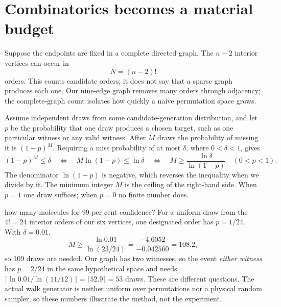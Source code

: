 \section{Combinatorics becomes a material budget}\label{sec:scaling}
Suppose the endpoints are fixed in a complete directed graph. The $n-2$ interior
vertices can occur in
\[
 N=(n-2)!
\]
orders. This counts candidate orders; it does not say that a sparse graph
produces each one. Our nine-edge graph removes many orders through adjacency;
the complete-graph count isolates how quickly a naive permutation space grows.
\begin{center}\end{center}

Assume independent draws from some candidate-generation distribution, and let $p$
be the probability that one draw produces a chosen target, such as one
particular witness or any valid witness. After $M$ draws the probability of
missing it is $(1-p)^M$. Requiring a miss probability of at most $\delta$, where
$0<\delta<1$, gives
\[
 (1-p)^M\le\delta
 \quad\Longleftrightarrow\quad
 M\ln(1-p)\le\ln\delta
 \quad\Longleftrightarrow\quad
 M\ge\frac{\ln\delta}{\ln(1-p)}\quad(0<p<1).
\]
The denominator $\ln(1-p)$ is negative, which reverses the inequality when we
divide by it. The minimum integer $M$ is the ceiling of the right-hand side. When
$p=1$ one draw suffices; when $p=0$ no finite number does.


\begin{Worked}{how many molecules for 99 per cent confidence?}
For a uniform draw from the $4!=24$ interior orders of our six vertices, one
designated order has $p=1/24$. With $\delta=0.01$,
\[
M\ge\frac{\ln 0.01}{\ln(23/24)}=\frac{-4.6052}{-0.042560}=108.2,
\]
so 109 draws are needed. Our graph has two witnesses, so the event \emph{either
witness} has $p=2/24$ in the same hypothetical space and needs
$\lceil\ln0.01/\ln(11/12)\rceil=\lceil52.9\rceil=53$ draws. These are different
questions. The actual walk generator is neither uniform over permutations nor a
physical random sampler, so these numbers illustrate the method, not the
experiment.
\end{Worked}

